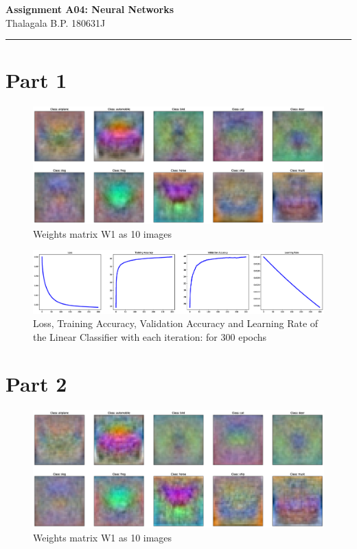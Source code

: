 \documentclass[a4paper,11pt]{article}%
\begin{document}
	\begin{center}
		{\large \textbf{Assignment A04: Neural Networks}}\\
		Thalagala B.P.\hspace{0.5cm} 180631J 
	\end{center}
	\hrule

\section{Part 1}

\begin{figure}[!h]
	\centering
	\includegraphics[scale=0.3]{figures/trainedWeightslc}
	\caption{Weights matrix W1 as 10 images}
\end{figure}

\begin{figure}[!h]
	\centering
	\includegraphics[scale=0.25]{figures/part1plots}
	\caption{Loss, Training Accuracy, Validation Accuracy and Learning Rate of the Linear Classifier with each iteration: for 300 epochs}
\end{figure}

\pagebreak
\section{Part 2}

\begin{figure}[!h]
	\centering
	\includegraphics[scale=0.3]{figures/trainedWeightsnn2}
	\caption{Weights matrix W1 as 10 images}
\end{figure}
\end{document}
